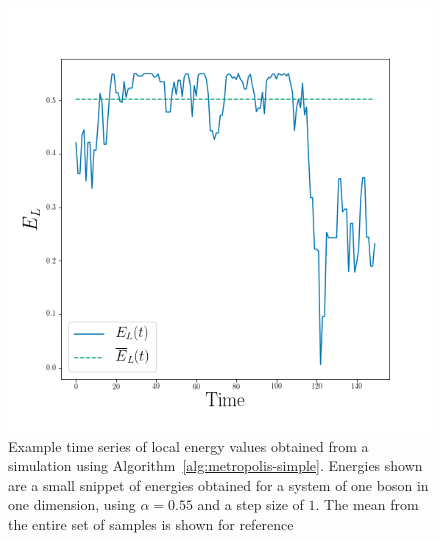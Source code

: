 \documentclass[a4paper, 11pt]{article}
\begin{document}
\begin{figure}[!h]
    \centering
    \includegraphics[width=0.8\linewidth]{../results/time-series-example.png}
    \caption{Example time series of local energy values obtained from a
    simulation using Algorithm~\ref{alg:metropolis-simple}. Energies shown
    are a small snippet of energies obtained for a system of one boson in one
    dimension, using $\alpha=0.55$ and a step size of $1$. The mean from the entire set of samples is shown for reference}
    \label{fig:time-series-example}
\end{figure}
\end{document}
